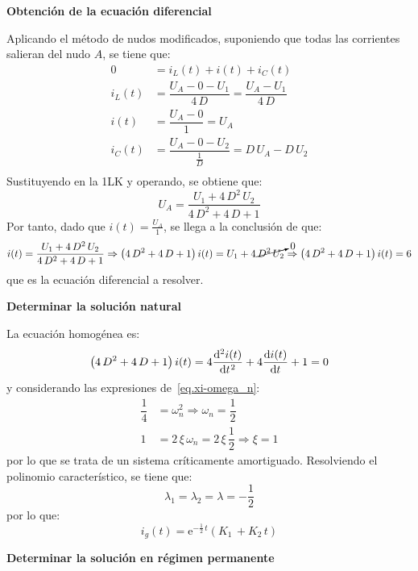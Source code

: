 \begin{example}
	    \textbf{Obtención de la ecuación diferencial}
	    
	    Aplicando el método de nudos modificados, suponiendo que todas las corrientes salieran del nudo $A$, se tiene que: 
	    \begin{align*}
	        0&=i_L(t)+i(t)+i_C(t)\\
	        i_L(t)&=\dfrac{U_A-0-U_1}{4\,D}=\dfrac{U_A-U_1}{4\,D}\\
	        i(t)&=\dfrac{U_A-0}{1}=U_A\\
	        i_C(t)&=\dfrac{U_A-0-U_2}{\frac{1}{D}}=D\,U_A-D\,U_2\\
	    \end{align*}
	Sustituyendo en la 1LK y operando, se obtiene que:
	\begin{equation*}
	    U_A=\dfrac{U_1+4\,D^2\,U_2}{4\,D^2+4\,D+1}
	\end{equation*}
	Por tanto, dado que $i(t)=\frac{U_A}{1}$, se llega a la conclusión de que:
	\begin{equation*}
	    i(t)=\dfrac{U_1+4\,D^2\,U_2}{4\,D^2+4\,D+1}\Rightarrow \left(4\,D^2+4\,D+1\right) i(t)=U_1+4\,\cancelto{0}{D^2\,U_2}\Rightarrow \left(4\,D^2+4\,D+1\right) i(t)=6
	\end{equation*}
    que es la ecuación diferencial a resolver. 
	    
	    \textbf{Determinar la solución natural}
	    
	    La ecuación homogénea es: 
	    \begin{equation*}
	        \left(4\,D^2+4\,D+1\right) i(t)=4\diff[2]{i(t)}{t}+4\diff{i(t)}{t}+1=0
	    \end{equation*}
	    y considerando las expresiones de~\eqref{eq.xi-omega_n}: 
	    \begin{align*}
	    \dfrac{1}{4}&=\omega_n^2\Rightarrow \omega_n=\dfrac{1}{2}\\
	    1&=2\,\xi\,\omega_n=2\,\xi\,\dfrac{1}{2}\Rightarrow \xi = 1
	\end{align*}
	por lo que se trata de un sistema críticamente amortiguado. Resolviendo el polinomio característico, se tiene que: 
    \begin{equation*}
        \lambda_1=\lambda_2=\lambda=-\dfrac{1}{2}
    \end{equation*}
    por lo que: 
    \begin{equation*}
        i_g(t)=\mathrm{e}^{-\frac{1}{2}\,t}(K_1\,+K_2\,t) 
    \end{equation*}
	    
	    \textbf{Determinar la solución en régimen permanente}
	    

\end{example}
